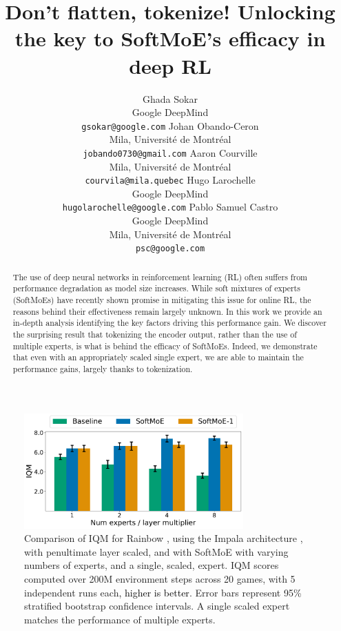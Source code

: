 \documentclass{article} %
\title{Don't flatten, tokenize! Unlocking the key to SoftMoE's efficacy in deep RL}
\author{
Ghada Sokar \\
Google DeepMind \\
\texttt{gsokar@google.com}
\And
Johan Obando-Ceron \\
Mila, Université de Montréal \\
\texttt{jobando0730@gmail.com}
\And
Aaron Courville \\
Mila, Université de Montréal \\
\texttt{courvila@mila.quebec}
\And
Hugo Larochelle \\
Google DeepMind \\
\texttt{hugolarochelle@google.com}
\And
Pablo Samuel Castro \\
Google DeepMind \\
Mila, Université de Montréal \\
\texttt{psc@google.com}
}
\newcommand{\rebuttal}[1]{\textcolor{black}{#1}}
\begin{document}
\maketitle

\begin{abstract}
The use of deep neural networks in reinforcement learning (RL) often suffers from performance degradation as model size increases. While soft mixtures of experts (SoftMoEs) have recently shown promise in mitigating this issue for online RL, the reasons behind their effectiveness remain largely unknown. In this work we provide an in-depth analysis identifying the key factors driving this performance gain. We discover the surprising result that tokenizing the encoder output, rather than the use of multiple experts, is what is behind the efficacy of SoftMoEs. Indeed, we demonstrate that even with an appropriately scaled single expert, we are able to maintain the performance gains, largely thanks to tokenization. 
\end{abstract}


\begin{figure}[!b]%
    \centering
    \includegraphics[width=0.75\textwidth]{figures/results/aggregate_comparison_just_iqm_bar.pdf}
    \caption{Comparison of IQM \citep{agarwal2021deep} for Rainbow \citep{hessel2018rainbow}, using the Impala architecture \citep{espeholt2018impala}, with {\color{SeabornGreen}penultimate layer scaled}, and with SoftMoE with {\color{SeabornBlue}varying numbers of experts}, and {\color{SeabornOrange}a single, scaled, expert}. IQM scores computed over 200M environment steps across 20 games, with 5 independent runs each\rebuttal{, higher is better}. Error bars represent 95\% stratified bootstrap confidence intervals. A single scaled expert matches the performance of multiple experts.
    }
    \label{fig:mainfig}
\end{figure}
\end{document}
